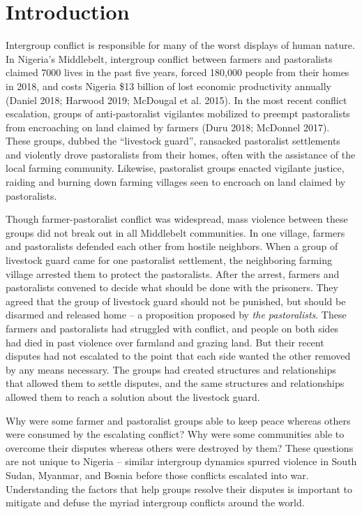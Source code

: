 \documentclass[11pt]{article}
\begin{document}
\section{Introduction}\label{introduction}

Intergroup conflict is responsible for many of the worst displays of
human nature. In Nigeria's Middlebelt, intergroup conflict between
farmers and pastoralists claimed 7000 lives in the past five years,
forced 180,000 people from their homes in 2018, and costs Nigeria \$13
billion of lost economic productivity annually (Daniel 2018; Harwood
2019; McDougal et al. 2015). In the most recent conflict escalation,
groups of anti-pastoralist vigilantes mobilized to preempt pastoralists
from encroaching on land claimed by farmers (Duru 2018; McDonnel 2017).
These groups, dubbed the ``livestock guard'', ransacked pastoralist
settlements and violently drove pastoralists from their homes, often
with the assistance of the local farming community. Likewise,
pastoralist groups enacted vigilante justice, raiding and burning down
farming villages seen to encroach on land claimed by pastoralists.

Though farmer-pastoralist conflict was widespread, mass violence between
these groups did not break out in all Middlebelt communities. In one
village, farmers and pastoralists defended each other from hostile
neighbors. When a group of livestock guard came for one pastoralist
settlement, the neighboring farming village arrested them to protect the
pastoralists. After the arrest, farmers and pastoralists convened to
decide what should be done with the prisoners. They agreed that the
group of livestock guard should not be punished, but should be disarmed
and released home -- a proposition proposed by \emph{the pastoralists}.
These farmers and pastoralists had struggled with conflict, and people
on both sides had died in past violence over farmland and grazing land.
But their recent disputes had not escalated to the point that each side
wanted the other removed by any means necessary. The groups had created
structures and relationships that allowed them to settle disputes, and
the same structures and relationships allowed them to reach a solution
about the livestock guard.

Why were some farmer and pastoralist groups able to keep peace whereas
others were consumed by the escalating conflict? Why were some
communities able to overcome their disputes whereas others were
destroyed by them? These questions are not unique to Nigeria -- similar
intergroup dynamics spurred violence in South Sudan, Myanmar, and Bosnia
before those conflicts escalated into war. Understanding the factors
that help groups resolve their disputes is important to mitigate and
defuse the myriad intergroup conflicts around the world.
\end{document}
